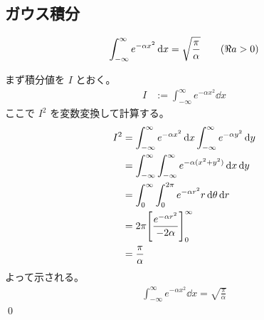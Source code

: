 \documentclass[uplatex,dvipdfmx,a4paper,11pt]{jlreq}
\makeatletter
\theoremstyle{definition}
\renewenvironment{proof}[1][\proofname]{\par
  \normalfont
  \topsep6\p@\@plus6\p@ \trivlist
  \item[\hskip\labelsep{\bfseries #1}\@addpunct{\bfseries}]\ignorespaces\quad\par
}{%
  \qed\endtrivlist\@endpefalse
}
\renewcommand\proofname{証明}
\makeatother
\begin{document}
\subsection{ガウス積分}
\begin{theorem}[Gauss 積分]
  \begin{align}
    \int_{-\infty}^{\infty} e^{-\alpha x^2}\dd{x} = \sqrt{\frac{\pi}{\alpha}} \qquad (\real a > 0)
  \end{align}
\end{theorem}
\begin{proof}
  まず積分値を $I$ とおく。
  \begin{align}
    I & := \int_{-\infty}^{\infty} e^{-\alpha x^2}\dd{x}
  \end{align}
  ここで $I^2$ を変数変換して計算する。
  \begin{align}
    I^2 & = \int_{-\infty}^{\infty} e^{-\alpha x^2}\dd{x}\int_{-\infty}^{\infty} e^{-\alpha y^2}\dd{y} \\
        & = \int_{-\infty}^{\infty}\int_{-\infty}^{\infty} e^{-\alpha(x^2 + y^2)}\dd{x}\dd{y}          \\
        & = \int_0^{\infty}\int_0^{2\pi}e^{-\alpha r^2}r\dd{\theta}\dd{r}                              \\
        & = 2\pi\qty[\frac{e^{-\alpha r^2}}{-2\alpha}]_0^{\infty}                                      \\
        & = \frac{\pi}{\alpha}
  \end{align}
  よって示される。
  \begin{align}
    \int_{-\infty}^{\infty} e^{-\alpha x^2}\dd{x} = \sqrt{\frac{\pi}{\alpha}}
  \end{align}
\end{proof}
\end{document}
